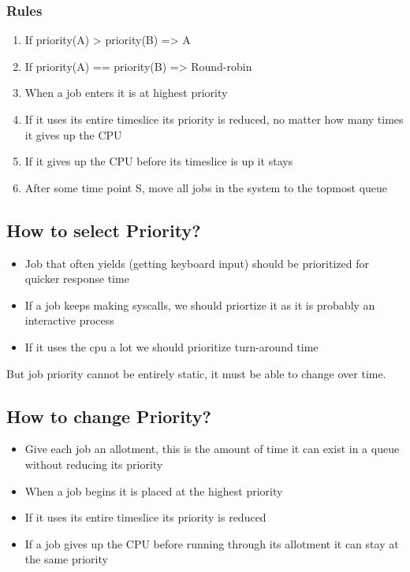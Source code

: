 \documentclass[11pt]{article}
\begin{document}
\subsubsection{Rules}
\label{sec:org478d466}
\begin{enumerate}
\item If priority(A) > priority(B) => A
\item If priority(A) == priority(B) => Round-robin
\item When a job enters it is at highest priority
\item If it uses its entire timeslice its priority is reduced, no matter how many times it gives up the CPU
\item If it gives up the CPU before its timeslice is up it stays
\item After some time point S, move all jobs in the system to the topmost queue
\end{enumerate}
\subsection{How to select Priority?}
\label{sec:org5761c3b}
\begin{itemize}
\item Job that often yields (getting keyboard input) should be prioritized for quicker response time
\item If a job keeps making syscalls, we should priortize it as it is probably an interactive process
\item If it uses the cpu a lot we should prioritize turn-around time
\end{itemize}

But job priority cannot be entirely static, it must be able to change over time.
\subsection{How to change Priority?}
\label{sec:org376f7d4}
\begin{itemize}
\item Give each job an allotment, this is the amount of time it can exist in a queue without reducing its priority
\item When a job begins it is placed at the highest priority
\item If it uses its entire timeslice its priority is reduced
\item If a job gives up the CPU before running through its allotment it can stay at the same priority
\end{itemize}
\end{document}
